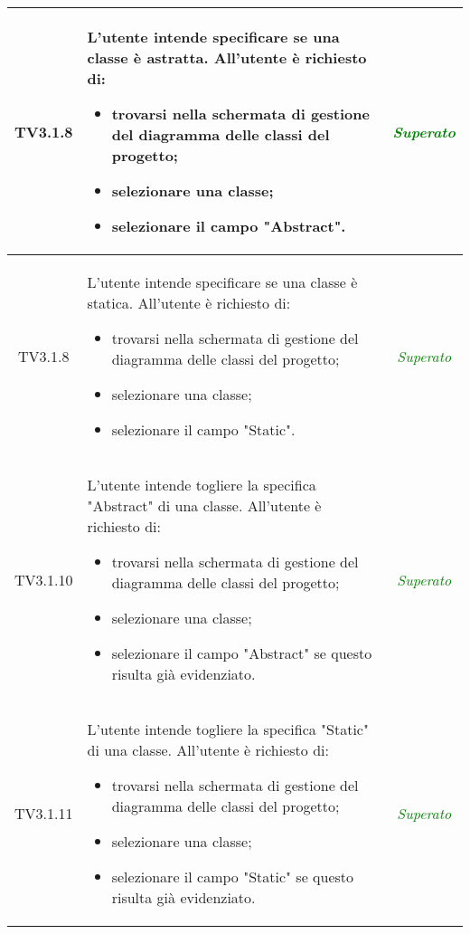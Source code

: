\begin{longtable}{|c|>{}m{8cm}|c|}
\hypertarget{TV3.1.8}{TV3.1.8} & L'utente intende specificare se una classe è astratta.
All'utente è richiesto di:
\begin{itemize}
	\item trovarsi nella schermata di gestione del diagramma delle classi del progetto;
	\item selezionare una classe;
	\item selezionare il campo "Abstract".
\end{itemize} & \textcolor{Green}{\textit{Superato}}\\ \hline


\hypertarget{TV3.1.8}{TV3.1.8} & L'utente intende specificare se una classe è statica.
All'utente è richiesto di:
\begin{itemize}
	\item trovarsi nella schermata di gestione del diagramma delle classi del progetto;
	\item selezionare una classe;
	\item selezionare il campo "Static".
\end{itemize} & \textcolor{Green}{\textit{Superato}}\\ \hline

\hypertarget{TV3.1.10}{TV3.1.10} & L'utente intende togliere la specifica "Abstract" di una classe.
All'utente è richiesto di:
\begin{itemize}
	\item trovarsi nella schermata di gestione del diagramma delle classi del progetto;
	\item selezionare una classe;
	\item selezionare il campo "Abstract" se questo risulta già evidenziato.
\end{itemize} & \textcolor{Green}{\textit{Superato}}\\ \hline

\hypertarget{TV3.1.11}{TV3.1.11} & L'utente intende togliere la specifica "Static" di una classe.
All'utente è richiesto di:
\begin{itemize}
	\item trovarsi nella schermata di gestione del diagramma delle classi del progetto;
	\item selezionare una classe;
	\item selezionare il campo "Static" se questo risulta già evidenziato.
\end{itemize} & \textcolor{Green}{\textit{Superato}}\\ \hline


\end{longtable}
